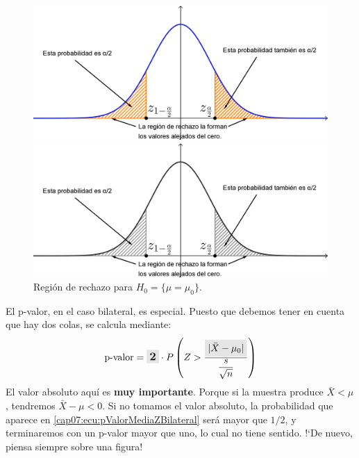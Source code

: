 \begin{figure}[htbp]
\begin{center}
\begin{enColor}
\includegraphics[width=13cm]{../fig/Cap07-RegionRechazoNormalBilateral.png}
\end{enColor}
\begin{bn}
\includegraphics[width=13cm]{../fig/Cap07-RegionRechazoNormalBilateral-bn.png}
\end{bn}
\caption{Regi\'on de rechazo para $H_0=\{\mu = \mu_0\}$.}
\label{cap07:fig:RegionRechazoNormalBilateral}
\end{center}
\end{figure}

El p-valor, en el caso bilateral, es especial. Puesto que debemos tener en cuenta que hay dos colas, se calcula mediante:
\begin{equation}
\label{cap07:ecu:pValorMediaZBilateral}
\mbox{p-valor}=\colorbox{lightgrey}{\large\bf 2}\cdot P\left(Z > \dfrac{ \colorbox{lightgrey}{$|\bar X-\mu_0|$}}{\dfrac{s}{\sqrt{n}}}\right)
\end{equation}
El valor absoluto aquí es {\bf muy importante}. Porque si la muestra produce $\bar X<\mu$, tendremos $\bar X-\mu<0$. Si no tomamos el valor absoluto, la probabilidad que aparece en  \ref{cap07:ecu:pValorMediaZBilateral} será mayor que $1/2$, y terminaremos con un p-valor mayor que uno, lo cual no tiene sentido. {!`}De nuevo, piensa siempre sobre una figura!

